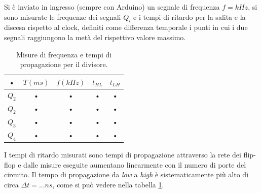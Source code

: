 \documentclass[10pt,a4paper]{article}
\begin{document}
Si è inviato in ingresso (sempre con Arduino) un segnale di frequenza $f = kHz$, si sono misurate le frequenze dei segnali $Q_i$ e i tempi di ritardo per la salita e la discesa rispetto al clock, definiti come differenza temporale i punti in cui i due segnali raggiungono la metà del rispettivo valore massimo.\\

\begin{table}[!htb]
\centering
\begin{tabular}{|c|c|c|c|c|}
\hline 
• & $T (ms)$ & $f (kHz)$ & $t_{HL}$ & $t_{LH}$ \\ 
\hline 
$Q_2$ & • & • & • & • \\ 
\hline 
$Q_2$ & • & • & • & • \\ 
\hline 
$Q_3$ & • & • & • & • \\ 
\hline 
$Q_4$ & • & • & • & • \\ 
\hline 
\end{tabular} 
\caption{Misure di frequenza e tempi di propagazione per il divisore. \label{misureDivisore}}
\end{table}


I tempi di ritardo misurati sono tempi di propagazione attraverso la rete dei flip-flop e dalle misure eseguite aumentano linearmente con il numero di porte del circuito. Il tempo di propagazione da \emph{low} a \emph{high} è sistematicamente più alto di circa $\Delta t = ... ns$, come si può vedere nella tabella \ref{misureDivisore}.\\ 
\end{document}

